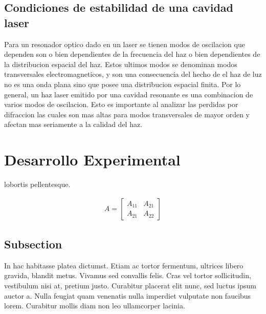\documentclass[10pt, a4paper]{article}%
\begin{document}
\begin{multicols}{2}
\subsection{Condiciones de estabilidad de una cavidad laser }
Para un resonador optico dado en un laser se tienen modos de oscilacion que dependen son o bien dependientes de la frecuencia del haz o bien dependientes de la distribucion espacial del haz. Estos ultimos modos se denominan modos transversales electromagneticos, y son una consecuencia del hecho de el haz de luz no es una onda plana sino que posee una distribucion espacial finita. Por lo general, un haz laser emitido por una cavidad resonante es una combinacion de varios modos de oscilacion. Esto es importante al analizar las perdidas por difraccion las cuales son mas altas para modos transversales de mayor orden y afectan mas seriamente a la calidad del haz.

\section{Desarrollo Experimental}

 lobortis pellentesque.


\begin{align}
	A = 
	\begin{bmatrix}
		A_{11} & A_{21} \\
		A_{21} & A_{22}
	\end{bmatrix}
\end{align}







\subsection{Subsection}

In hac habitasse platea dictumst. Etiam ac tortor fermentum, ultrices libero gravida, blandit metus. Vivamus sed convallis felis. Cras vel tortor sollicitudin, vestibulum nisi at, pretium justo. Curabitur placerat elit nunc, sed luctus ipsum auctor a. Nulla feugiat quam venenatis nulla imperdiet vulputate non faucibus lorem. Curabitur mollis diam non leo ullamcorper lacinia.



\end{multicols}
\end{document}
